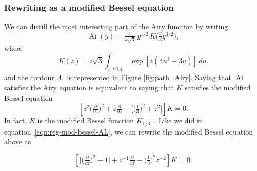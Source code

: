 \documentclass{article}
\DeclareMathOperator{\Ai}{Ai}
\theoremstyle{definition}
\theoremstyle{plain}
\begin{document}
\subsubsection{Rewriting as a modified Bessel equation}
We can distill the most interesting part of the Airy function by writing
\[ \Ai(y) = \tfrac{1}{\pi\sqrt{3}}\,y^{1/2}\,K\big(\tfrac{2}{3} y^{3/2}\big), \]
where
\begin{equation}\label{integral:mod-bessel}
K(z) = i\sqrt{3} \int_{z^{-1/3}\Lambda_1} \exp\left[z \left(4u^3 - 3u\right)\right]\,du.
\end{equation}
and the contour $\Lambda_1$ is represented in Figure \ref{fig:path_Airy}.
Saying that $\Ai$ satisfies the Airy equation is equivalent to saying that $K$ satisfies the modified Bessel equation
\begin{equation}\label{eqn:mod-bessel-1/3}
\left[z^2 \big(\tfrac{\partial}{\partial z}\big)^2 + z \tfrac{\partial}{\partial z} - \big[\big(\tfrac{1}{3}\big)^2 + z^2\big]\right] K = 0.
\end{equation}
In fact, $K$ is the modified Bessel function $K_{1/3}$~\cite[equation~9.6.1]{dlmf}.
Like we did in equation~\eqref{eqn:reg-mod-bessel-AL}, we can rewrite the modified Bessel equation above as 

\begin{equation}\label{eqn:reg-mod-bessel}
\left[ \big[ \big(\tfrac{\partial}{\partial z}\big)^2 - 1 \big] + z^{-1} \tfrac{\partial}{\partial z} - \big(\tfrac{1}{3}\big)^2 z^{-2} \right] K = 0.
\end{equation}
\end{document}
